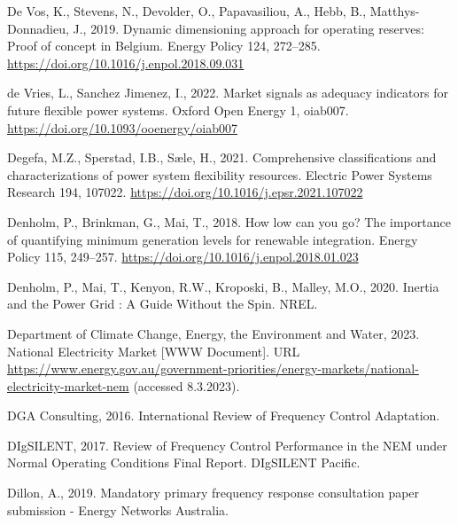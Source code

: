 \documentclass[12pt,a4paper,]{report}
\newlength{\cslhangindent}
\newenvironment{CSLReferences}[2] %
 {%
  \setlength{\parindent}{0pt}
  \ifodd #1 \everypar{\setlength{\hangindent}{\cslhangindent}}\ignorespaces\fi
  \ifnum #2 > 0
  \setlength{\parskip}{#2\baselineskip}
  \fi
 }%
 {}
\begin{document}
\begin{CSLReferences}{1}{0}
\leavevmode{}%
De Vos, K., Stevens, N., Devolder, O., Papavasiliou, A., Hebb, B.,
Matthys-Donnadieu, J., 2019. Dynamic dimensioning approach for operating
reserves: {Proof} of concept in {Belgium}. Energy Policy 124, 272--285.
\url{https://doi.org/10.1016/j.enpol.2018.09.031}

\leavevmode{}%
de Vries, L., Sanchez Jimenez, I., 2022. Market signals as adequacy
indicators for future flexible power systems. Oxford Open Energy 1,
oiab007. \url{https://doi.org/10.1093/ooenergy/oiab007}

\leavevmode{}%
Degefa, M.Z., Sperstad, I.B., Sæle, H., 2021. Comprehensive
classifications and characterizations of power system flexibility
resources. Electric Power Systems Research 194, 107022.
\url{https://doi.org/10.1016/j.epsr.2021.107022}

\leavevmode{}%
Denholm, P., Brinkman, G., Mai, T., 2018. How low can you go? {The}
importance of quantifying minimum generation levels for renewable
integration. Energy Policy 115, 249--257.
\url{https://doi.org/10.1016/j.enpol.2018.01.023}

\leavevmode{}%
Denholm, P., Mai, T., Kenyon, R.W., Kroposki, B., Malley, M.O., 2020.
Inertia and the {Power Grid} : {A Guide Without} the {Spin}. {NREL}.

\leavevmode{}%
Department of Climate Change, Energy, the Environment and Water, 2023.
National {Electricity Market} {[}WWW Document{]}. URL
\url{https://www.energy.gov.au/government-priorities/energy-markets/national-electricity-market-nem}
(accessed 8.3.2023).

\leavevmode{}%
DGA Consulting, 2016. International {Review} of {Frequency Control
Adaptation}.

\leavevmode{}%
DIgSILENT, 2017. Review of {Frequency Control Performance} in the {NEM}
under {Normal Operating Conditions Final Report}. {DIgSILENT Pacific}.

\leavevmode{}%
Dillon, A., 2019. Mandatory primary frequency response consultation
paper submission - {Energy Networks Australia}.


\end{CSLReferences}
\end{document}
